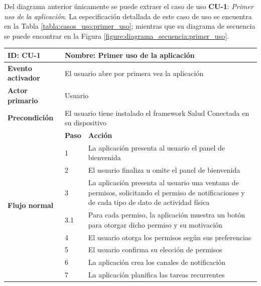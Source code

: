             Del diagrama anterior únicamente se puede extraer el caso de uso \textbf{CU-1}\label{disenio:casos_uso:primer_uso}: \textit{Primer uso de la aplicación}. La especificación detallada de este caso de uso se encuentra en la Tabla \ref{tabla:casos_uso:primer_uso}; mientras que su diagrama de secuencia se puede encontrar en la Figura \ref{figure:diagrama_secuencia:primer_uso}.

            \begin{table}[h]
                \centering
                \begin{tabularx}{\textwidth}{|l|l|X|}
                    \hline
                    \textbf{ID:} CU-1 & \multicolumn{2}{|X|}{\textbf{Nombre}: Primer uso de la aplicación} \\
                    \hline
                    \textbf{Evento activador} & \multicolumn{2}{|X|}{El usuario abre por primera vez la aplicación} \\
                    \hline
                    \textbf{Actor primario} & \multicolumn{2}{|X|}{Usuario} \\
                    \hline
                    \textbf{Precondición} & \multicolumn{2}{|X|}{El usuario tiene instalado el \gls{framework} Salud Conectada en su dispositivo} \\
                    \hline
                    \multirow{10}{*}{\textbf{Flujo normal}} & \textbf{Paso} & \textbf{Acción} \\
                    \cline{2-3} & 1 & La aplicación presenta al usuario el panel de bienvenida \\
                    \cline{2-3} & 2 & El usuario finaliza u omite el panel de bienvenida \\
                    \cline{2-3} & 3 & La aplicación presenta al usuario una ventana de permisos, solicitando el permiso de notificaciones y de cada tipo de dato de actividad física \\
                    \cline{2-3} & 3.1 & Para cada permiso, la aplicación muestra un botón para otorgar dicho permiso y su motivación \\
                    \cline{2-3} & 4 & El usuario otorga los permisos según sus preferencias \\
                    \cline{2-3} & 5 & El usuario confirma su elección de permisos \\
                    \cline{2-3} & 6 & La aplicación crea los canales de notificación \\
                    \cline{2-3} & 7 & La aplicación planifica las tareas recurrentes \\

\end{tabularx}
\end{table}
